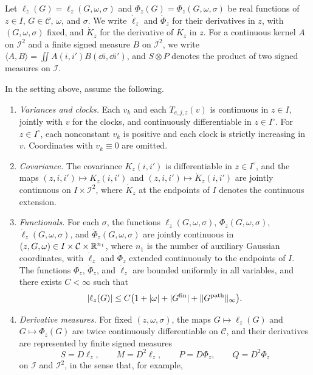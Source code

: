 Let $\ell_z(G)=\ell_z(G,\omega,\sigma)$ and
$\Phi_z(G)=\Phi_z(G,\omega,\sigma)$ be real functions of $z\in I$,
$G\in\mathcal C$, $\omega$, and $\sigma$. We write $\dot\ell_z$ and
$\dot\Phi_z$ for their derivatives in $z$, with $(G,\omega,\sigma)$
fixed, and $\dot K_z$ for the derivative of $K_z$ in $z$. For a
continuous kernel $A$ on $\mathcal I^2$ and a finite signed measure $B$
on $\mathcal I^2$, we write $\langle A,B\rangle=\iint A(i,i')B(\dd i,\dd i')$,
and $S\otimes P$ denotes the product of two signed measures on
$\mathcal I$.

\begin{lemma}
\label{lem:fnd-path-heat}
In the setting above, assume the following.
\begin{enumerate}[label=\textup{(A\arabic*)}]
\item \emph{Variances and clocks.} Each $v_k$ and each $T_{e,j,z}(v)$ is
continuous in $z\in I$, jointly with $v$ for the clocks, and
continuously differentiable in $z\in I^\circ$. For $z\in I^\circ$, each
nonconstant $v_k$ is positive and each clock is strictly increasing in
$v$. Coordinates with $v_k\equiv0$ are omitted.
\item \emph{Covariance.} The covariance $K_z(i,i')$ is differentiable in
$z\in I^\circ$, and the maps $(z,i,i')\mapsto K_z(i,i')$ and
$(z,i,i')\mapsto\dot K_z(i,i')$ are jointly continuous on
$I\times\mathcal I^2$, where $\dot K_z$ at the endpoints of $I$ denotes
the continuous extension.
\item \emph{Functionals.} For each $\sigma$, the functions
$\ell_z(G,\omega,\sigma)$, $\Phi_z(G,\omega,\sigma)$,
$\dot\ell_z(G,\omega,\sigma)$, and $\dot\Phi_z(G,\omega,\sigma)$ are jointly
continuous in $(z,G,\omega)\in I\times\mathcal C\times\mathbb R^{n_1}$,
where $n_1$ is the number of auxiliary Gaussian coordinates, with
$\dot\ell_z$ and $\dot\Phi_z$ extended continuously to the endpoints of $I$.
The functions $\Phi_z$, $\dot\Phi_z$, and
$\dot\ell_z$ are bounded uniformly in all variables, and there exists
$C<\infty$ such that
\[
 |\ell_z(G)|\le C\bigl(1+|\omega|+|G^{\rm fin}|+\|G^{\rm path}\|_\infty\bigr).
\]
\item \emph{Derivative measures.} For fixed $(z,\omega,\sigma)$, the maps
$G\mapsto\ell_z(G)$ and $G\mapsto\Phi_z(G)$ are twice continuously
differentiable on $\mathcal C$, and their derivatives are represented by
finite signed measures
\[
 S=D\ell_z,\qquad M=D^2\ell_z,\qquad
 P=D\Phi_z,\qquad Q=D^2\Phi_z
\]
on $\mathcal I$ and $\mathcal I^2$, in the sense that, for example,
\[
\]
\end{enumerate}
\end{lemma}

